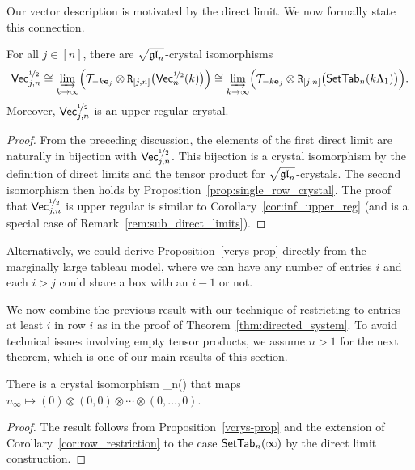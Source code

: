 \documentclass[11pt]{article}
\begin{document}
Our vector description is motivated by the direct limit.
We now formally state this connection.

\begin{proposition}\label{vcrys-prop}
For all $j \in [n]$, there are $\sqrt{\mathfrak{gl}_n}$-crystal isomorphisms
\[
\mathsf{Vec}^{\nicefrac{1}{2}}_{j,n} \cong \varinjlim_{k\to\infty}\Bigl( \mathcal{T}_{-k\textbf{e}_j}\otimes \mathtt{R}_{[j,n]}\bigl(\mathsf{Vec}^{\nicefrac{1}{2}}_n(k) \bigr) \Bigr)
\cong \varinjlim_{k\to\infty} \Bigl(\mathcal{T}_{-k\textbf{e}_j}\otimes \mathtt{R}_{[j,n]} \bigl(\mathsf{SetTab}_n(k\Lambda_1)\bigr)\Bigr).
\]
Moreover, $\mathsf{Vec}^{\nicefrac{1}{2}}_{j,n}$ is an upper regular crystal.
\end{proposition}

\begin{proof}
From the preceding discussion, the elements of the first direct limit are naturally in bijection with $\mathsf{Vec}^{\nicefrac{1}{2}}_{j,n}$.
This bijection is a crystal isomorphism by the definition of direct limits and the tensor product for $\sqrt{\mathfrak{gl}_n}$-crystals.
The second isomorphism then holds by Proposition~\ref{prop:single_row_crystal}.
The proof that $\mathsf{Vec}^{\nicefrac{1}{2}}_{j,n}$ is upper regular is similar to Corollary~\ref{cor:inf_upper_reg} (and is a special case of Remark~\ref{rem:sub_direct_limits}).
\end{proof}

Alternatively, we could derive Proposition~\ref{vcrys-prop} directly from the marginally large tableau model, where we can have any number of entries $i$ and each $i > j$ could share a box with an $i - 1$ or not.

We now combine the previous result with our technique of restricting to entries at least $i$ in row $i$ as in the proof of Theorem~\ref{thm:directed_system}.
To avoid technical issues involving empty tensor products, we assume $n>1$ for the next theorem, which is one of our main results of this section.

\begin{theorem}
\label{BZL-cor}
There is a crystal isomorphism
\be
\label{eq:Lusztig_param}
\SetTab_n(\infty) \iso {} \otimes \cdots \otimes {} \otimes {}
\ee
that maps $u_{\infty} \mapsto (0) \otimes (0, 0) \otimes \cdots \otimes (0, \dotsc, 0)$.
\end{theorem}

\begin{proof}
The result follows from Proposition~\ref{vcrys-prop} and the extension of Corollary~\ref{cor:row_restriction} to the case $\mathsf{SetTab}_n(\infty)$ by the direct limit construction.
\end{proof}
\end{document}
